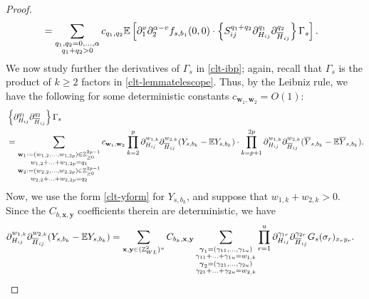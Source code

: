 \begin{proof}
\begin{align}
&=\sum_{\substack{q_{1},q_{2}=0,\ldots,\alpha\\q_{1}+q_{2}>0}}c_{q_{1},q_{2}}\mathbb{E}\left[\partial_{1}^{v}\partial_{2}^{\alpha-v}f_{s,b_{1}}(0,0)\cdot\left\{S_{ij}^{q_{1}+q_{2}}\partial_{H_{ij}}^{q_{1}}\partial_{\overline{H}_{ij}}^{q_{2}}\right\}\Gamma_{s}\right].\label{clt-ibp}
\end{align}
%
We now study further the derivatives of $\Gamma_{s}$ in \eqref{clt-ibp}; again, recall that $\Gamma_{s}$ is the product of $k\geq2$ factors in \eqref{clt-lemmatelescope}. Thus, by the Leibniz rule, we have the following for some deterministic constants $c_{\textbf{w}_{1},\textbf{w}_{2}}=O(1)$:
%
\begin{align}
&\left\{\partial_{H_{ij}}^{q_{1}}\partial_{\overline{H}_{ij}}^{q_{2}}\right\}\Gamma_{s}\label{clt-ibp-leibniz}\\
&=\sum_{\substack{\mathbf{w}_{1}:=(w_{1,2},\ldots,w_{1,2p})\in\mathbb{Z}_{\geq0}^{2p-1}\\w_{1,2}+\ldots+w_{1,2p}=q_{1}\\\mathbf{w}_{2}:=(w_{2,2},\ldots,w_{2,2p})\in\mathbb{Z}_{\geq0}^{2p-1}\\w_{2,2}+\ldots+w_{2,2p}=q_{2}}}c_{\textbf{w}_{1},\textbf{w}_{2}}\prod_{k=2}^{p}\partial_{H_{ij}}^{w_{1,k}}\partial_{\overline{H}_{ij}}^{w_{2,k}}(Y_{s,b_{k}}-\mathbb{E} Y_{s,b_{k}})\cdot\prod_{k=p+1}^{2p}\partial_{H_{ij}}^{w_{1,k}}\partial_{\overline{H}_{ij}}^{w_{2,k}}(\overline{Y}_{s,b_{k}}-\mathbb{E}\overline{Y}_{s,b_{k}}).\nonumber
\end{align}
%
Now, we use the form \eqref{clt-yform} for $Y_{s,b_{k}}$, and suppose that $w_{1,k}+w_{2,k}>0$. Since the $C_{b,\textbf{x},\textbf{y}}$ coefficients therein are deterministic, we have
%
\begin{align}
\partial_{H_{ij}}^{w_{1,k}}\partial_{\overline{H}_{ij}}^{w_{2,k}}(Y_{s,b_{k}}-\mathbb{E} Y_{s,b_{k}})&=\sum_{\textbf{x},\textbf{y}\in(\mathbb{Z}_{WL}^{2})^{u}}C_{b_{k},\textbf{x},\textbf{y}}\sum_{\substack{\boldsymbol{\gamma}_{1}=(\gamma_{11},\ldots,\gamma_{1u})\\\gamma_{11}+\ldots+\gamma_{1u}=w_{1,k}\\\boldsymbol{\gamma}_{2}=(\gamma_{21},\ldots,\gamma_{2u})\\\gamma_{21}+\ldots+\gamma_{2u}=w_{2,k}}}\prod_{r=1}^{u}\partial_{H_{ij}}^{\gamma_{1r}}\partial_{\overline{H}_{ij}}^{\gamma_{2r}}G_{s}(\sigma_{r})_{x_{r}y_{r}}.\label{clt-ibp-leibniz-formula}
\end{align}
%

\end{proof}
